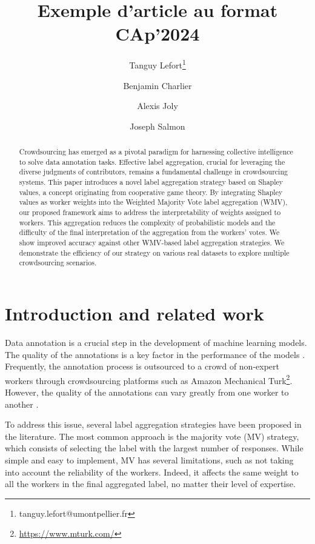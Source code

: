 \documentclass{cap2024}
\title{Exemple d'article au format CAp'2024}
\author[1]{Tanguy Lefort\thanks{tanguy.lefort@umontpellier.fr}}
\author[2]{Benjamin Charlier}
\author[3]{Alexis Joly}
\author[4]{Joseph Salmon}
\affil[1]{University of Montpellier, IMAG, CNRS, LIRMM, Inria}
\affil[2]{University of Montpellier, IMAG, CNRS}
\affil[3]{LIRMM, Inria}
\affil[4]{University of Montpellier, IMAG, CNRS, Institut Universitaire de France (IUF)}
\begin{document}
\maketitle

\begin{abstract}
  Crowdsourcing has emerged as a pivotal paradigm for harnessing collective intelligence to solve data annotation tasks. Effective label aggregation, crucial for leveraging the diverse judgments of contributors, remains a fundamental challenge in crowdsourcing systems. This paper introduces a novel label aggregation strategy based on Shapley values, a concept originating from cooperative game theory. By integrating Shapley values as worker weights into the Weighted Majority Vote label aggregation (WMV), our proposed framework aims to address the interpretability of weights assigned to workers. This aggregation reduces the complexity of probabilistic models and the difficulty of the final interpretation of the aggregation from the workers' votes. We show improved accuracy against other WMV-based label aggregation strategies. We demonstrate the efficiency of our strategy on various real datasets to explore multiple crowdsourcing scenarios.
\medskip

\end{abstract}


\section{Introduction and related work}
\label{sec:intro}

Data annotation is a crucial step in the development of machine learning models. The quality of the annotations is a key factor in the performance of the models \citep{snow_cheap_2008}.
Frequently, the annotation process is outsourced to a crowd of non-expert workers through crowdsourcing platforms such as Amazon Mechanical Turk\footnote{\url{https://www.mturk.com/}}.
However, the quality of the annotations can vary greatly from one worker to another \citep{ross2009turkers,ipeirotis2010quality,hara2018data}.

To address this issue, several label aggregation strategies have been proposed in the literature.
The most common approach is the majority vote (MV) strategy, which consists of selecting the label with the largest number of responses.
While simple and easy to implement, MV has several limitations, such as not taking into account the reliability of the workers. Indeed, it affects the same weight to all the workers in the final aggregated label, no matter their level of expertise.
\end{document}
